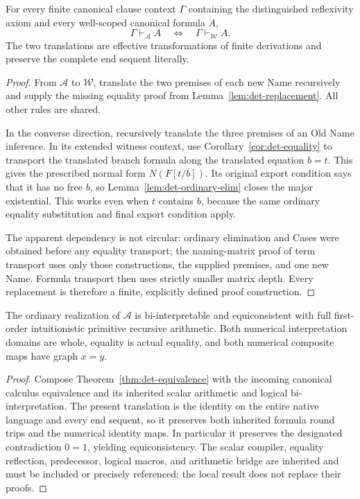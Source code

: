 \begin{theorem}
\label{thm:det-equivalence}
For every finite canonical clause context $\Gamma$ containing the
distinguished reflexivity axiom and every well-scoped canonical formula
$A$,
\[
               \Gamma\vdash_{\mathcal A} A
          \quad\Longleftrightarrow\quad
               \Gamma\vdash_{\mathcal W} A.
\]
The two translations are effective transformations of finite derivations
and preserve the complete end sequent literally.
\end{theorem}
\begin{proof}
From $\mathcal A$ to $\mathcal W$, translate the two premises of each
new Name recursively and supply the missing equality proof from
Lemma~\ref{lem:det-replacement}. All other rules are shared.

In the converse direction, recursively translate the three premises of
an Old Name inference. In its extended witness context, use
Corollary~\ref{cor:det-equality} to transport the translated branch
formula along the translated equation $b=t$. This gives the prescribed
normal form $N(F[t/b])$. Its original export condition says that it has
no free $b$, so Lemma~\ref{lem:det-ordinary-elim} closes the major
existential. This works even when $t$ contains $b$, because the same
ordinary equality substitution and final export condition apply.

The apparent dependency is not circular: ordinary elimination and
Cases were obtained before any equality transport; the naming-matrix
proof of term transport uses only those constructions, the supplied
premises, and one new Name. Formula transport then uses strictly
smaller matrix depth. Every replacement is therefore a finite, explicitly
defined proof construction.
\end{proof}

\begin{corollary}
The ordinary realization of $\mathcal A$ is bi-interpretable and
equiconsistent with full first-order intuitionistic primitive recursive
arithmetic. Both numerical interpretation domains are whole, equality
is actual equality, and both numerical composite maps have graph $x=y$.
\end{corollary}
\begin{proof}
Compose Theorem~\ref{thm:det-equivalence} with the incoming canonical
calculus equivalence and its inherited scalar arithmetic and logical
bi-interpretation. The present translation is the identity on the entire
native language and every end sequent, so it preserves both inherited
formula round trips and the numerical identity maps. In particular it
preserves the designated contradiction $0=1$, yielding equiconsistency.
The scalar compiler, equality reflection, predecessor, logical macros,
and arithmetic bridge are inherited and must be included or precisely
referenced; the local result does not replace their proofs.
\end{proof}

